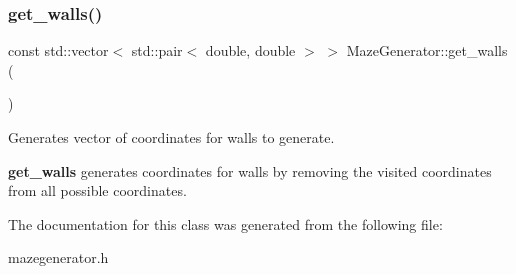 \subsubsection{\texorpdfstring{get\+\_\+walls()}{get\_walls()}}
{\footnotesize\ttfamily const std\+::vector$<$ std\+::pair$<$ double, double $>$ $>$ Maze\+Generator\+::get\+\_\+walls (\begin{DoxyParamCaption}{ }\end{DoxyParamCaption})}



Generates vector of coordinates for walls to generate. 

{\bfseries get\+\_\+walls} generates coordinates for walls by removing the visited coordinates from all possible coordinates. 

The documentation for this class was generated from the following file\+:\begin{DoxyCompactItemize}
\item 
mazegenerator.\+h\end{DoxyCompactItemize}
